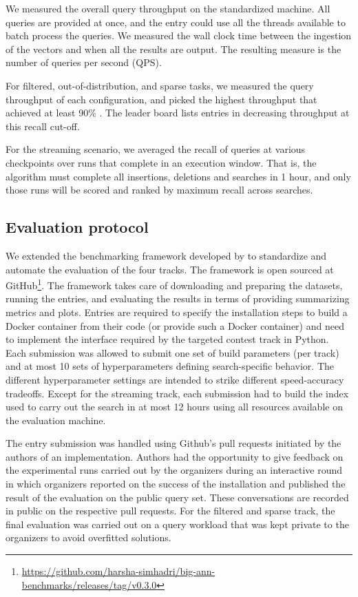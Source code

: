 We measured the overall query
throughput on the standardized machine.
%
All queries are provided at once, and the entry could use all the threads available 
to batch process the queries.
%
We measured the wall clock time
between the ingestion of the vectors and when all the results are output.
%
The resulting measure is the number of queries per second (QPS).


 For filtered, out-of-distribution, and sparse tasks,
we measured the query throughput of each configuration, and picked the
highest throughput that achieved at least 90\% . 
%
The leader board lists entries in decreasing throughput at this recall cut-off.

For the streaming scenario, we averaged the recall of queries at various checkpoints
over runs that complete in an execution window.
%
That is, the algorithm must complete all insertions, deletions and searches in 1 hour,
and only those runs will be scored and ranked by maximum recall across searches.




\subsection{Evaluation protocol}

We extended the benchmarking framework developed by \cite{DBLP:conf/nips/SimhadriWADBBCH21} 
to standardize and automate the evaluation of the four tracks. 
%
The framework is open sourced at GitHub\footnote{\url{https://github.com/harsha-simhadri/big-ann-benchmarks/releases/tag/v0.3.0}}.
%
The framework takes care of downloading and preparing the datasets,
running the entries, and evaluating the results in terms of providing summarizing metrics and plots.
%
Entries are required to specify the installation steps to build a Docker container from
their code (or provide such a Docker container) and need to implement 
the interface required by the targeted contest track in Python.
%
Each submission was allowed to submit one set of build parameters (per track) and at most 10 sets of hyperparameters defining search-specific behavior. 
The different hyperparameter settings are intended to strike different speed-accuracy tradeoffs.
%
Except for the streaming track, each submission had to build the index used to carry 
out the search in at most 12 hours using all resources available on the evaluation machine.


The entry submission was handled using Github's pull requests initiated by the authors of an implementation.
%
Authors had the opportunity to give feedback on the experimental runs carried out by the organizers during 
an interactive round in which organizers reported on the success of the installation and published the result
of the evaluation on the public query set.
%
These conversations are recorded in public on the respective pull requests.
%
For the filtered and sparse track, the final evaluation was carried out on a query workload that was kept private to the organizers to avoid overfitted solutions.

